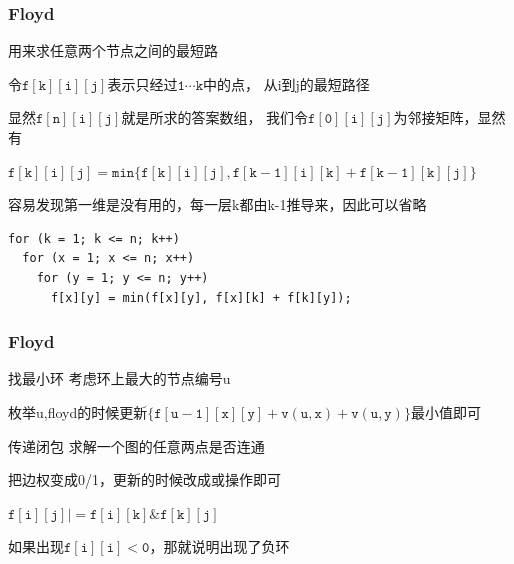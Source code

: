 \documentclass{beamer}
\begin{document}
  \begin{frame}
    \frametitle{Floyd}

    用来求任意两个节点之间的最短路

    \vspace*{1\baselineskip}
    
    令$\mathtt{f[k][i][j]}$表示只经过$\mathtt{1\cdots k}$中的点，
    从i到j的最短路径

    \vspace*{1\baselineskip}
    
    显然$\mathtt{f[n][i][j]}$就是所求的答案数组，
    我们令$\mathtt{f[0][i][j]}$为邻接矩阵，显然有

    \vspace*{1\baselineskip}

    $\mathtt{f[k][i][j]=min\{f[k][i][j],f[k-1][i][k]+f[k-1][k][j]\}}$
  \end{frame}

  \begin{frame}[fragile]
    容易发现第一维是没有用的，每一层k都由k-1推导来，因此可以省略

    \vspace*{1\baselineskip}

    \begin{lstlisting}
for (k = 1; k <= n; k++)
  for (x = 1; x <= n; x++)
    for (y = 1; y <= n; y++)
      f[x][y] = min(f[x][y], f[x][k] + f[k][y]);
    \end{lstlisting}
  \end{frame}

  \begin{frame}
    \frametitle{Floyd}

    \begin{block}{找最小环}
      考虑环上最大的节点编号u
      
      枚举u,floyd的时候更新$\mathtt{\{f[u-1][x][y]+v(u,x)+v(u,y)\}}$最小值即可
    \end{block}

    \pause

    \begin{block}{传递闭包}
      求解一个图的任意两点是否连通

      \vspace*{1\baselineskip}

      把边权变成0/1，更新的时候改成或操作即可

      $\mathtt{f[i][j]|=f[i][k] \& f[k][j]}$
    \end{block}

    \pause

    如果出现$\mathtt{f[i][i]<0}$，那就说明出现了负环
  \end{frame}
\end{document}
